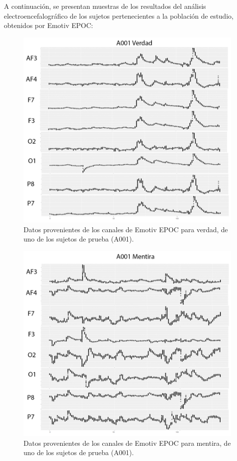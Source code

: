 A continuación, se presentan muestras de los resultados del análisis electroencefalográfico de los sujetos pertenecientes a la población de estudio, obtenidos por Emotiv EPOC:  
\begin{figure}
    \centering
    \includegraphics[scale=0.75]{figuras/Imagen5.png}
    \caption{Datos provenientes de los canales de Emotiv EPOC para verdad, de uno de los sujetos de prueba (A001).}
    \label{fig:my_label}
\end{figure}
\begin{figure}
    \centering
    \includegraphics[scale=0.75]{figuras/Imagen6.png}
    \caption{Datos provenientes de los canales de Emotiv EPOC para mentira, de uno de los sujetos de prueba (A001).}
    \label{fig:my_label}
\end{figure}
